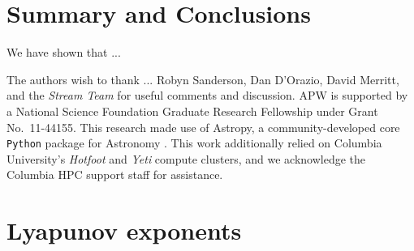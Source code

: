 \documentclass[letterpaper,12pt,preprint]{aastex}
\newcommand{\ident}{\mathbb{1}}
\begin{document}
\section{Summary and Conclusions}\label{sec:conclusions}
We have shown that ...

\acknowledgements
The authors wish to thank ... Robyn Sanderson, Dan D'Orazio, David Merritt, and the \emph{Stream Team} for useful comments and discussion.
APW is supported by a National Science Foundation Graduate Research Fellowship under Grant No.\ 11-44155. 
This research made use of Astropy, a community-developed core \texttt{Python} package for Astronomy \citep{astropy13}.
This work additionally relied on Columbia University's \emph{Hotfoot} and \emph{Yeti} compute clusters, and we acknowledge the Columbia HPC support staff for assistance.




\appendix
\section{Lyapunov exponents} \label{sec:lyapapdx}

\end{document}
